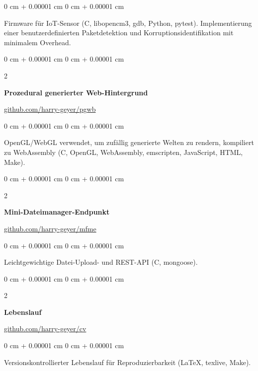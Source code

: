 \documentclass[10pt, letterpaper]{article}
\newenvironment{onecolentry}{
    \begin{adjustwidth}{
        0 cm + 0.00001 cm
    }{
        0 cm + 0.00001 cm
    }
}{
    \end{adjustwidth}
}
\newenvironment{twocolentry}[2][]{
    \onecolentry
    \def\secondColumn{#2}
    \setcolumnwidth{\fill, 4.75 cm}
    \begin{paracol}{2}
}{
    \switchcolumn \raggedleft \secondColumn
    \end{paracol}
    \endonecolentry
}
\begin{document}
        \vspace{0.10 cm}
        \begin{onecolentry}
            Firmware für IoT-Sensor (C, libopencm3, gdb, Python, pytest). Implementierung einer benutzerdefinierten Paketdetektion und Korruptionsidentifikation mit minimalem Overhead.
        \end{onecolentry}

        \vspace{0.2 cm}

        \begin{twocolentry}{\href{https://github.com/harry-geyer/pgwb}{github.com/harry-geyer/pgwb}}
            \textbf{Prozedural generierter Web-Hintergrund}
        \end{twocolentry}

        \vspace{0.10 cm}
        \begin{onecolentry}
            OpenGL/WebGL verwendet, um zufällig generierte Welten zu rendern, kompiliert zu WebAssembly (C, OpenGL, WebAssembly, emscripten, JavaScript, HTML, Make).
        \end{onecolentry}

        \vspace{0.2 cm}

        \begin{twocolentry}{\href{https://github.com/harry-geyer/mfme}{github.com/harry-geyer/mfme}}
            \textbf{Mini-Dateimanager-Endpunkt}
        \end{twocolentry}

        \vspace{0.10 cm}
        \begin{onecolentry}
            Leichtgewichtige Datei-Upload- und REST-API (C, mongoose).
        \end{onecolentry}

        \vspace{0.2 cm}

        \begin{twocolentry}{\href{https://github.com/harry-geyer/cv}{github.com/harry-geyer/cv}}
            \textbf{Lebenslauf}
        \end{twocolentry}

        \vspace{0.10 cm}
        \begin{onecolentry}
            Versionskontrollierter Lebenslauf für Reproduzierbarkeit (LaTeX, texlive, Make).
        \end{onecolentry}
\end{document}
